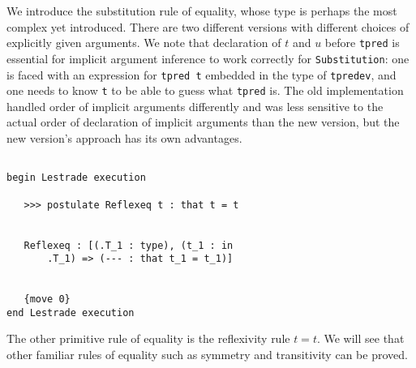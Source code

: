\documentclass[12pt]{article}
\begin{document}
We introduce the substitution rule of equality, whose type is perhaps the most complex yet introduced.   There are two different versions with different choices of explicitly given arguments.  We note that declaration of $t$ and $u$ before {\tt tpred} is essential for implicit argument inference to work correctly for {\tt Substitution}:  one is faced with an expression for
{\tt tpred t} embedded in the type of {\tt tpredev}, and one needs to know {\tt t} to be able to guess what {\tt tpred} is.   The old implementation handled order of implicit arguments
differently and was less sensitive to the actual order of declaration of implicit arguments than the new version, but the new version's approach has its own advantages.

\begin{verbatim}

begin Lestrade execution

   >>> postulate Reflexeq t : that t = t


   Reflexeq : [(.T_1 : type), (t_1 : in 
       .T_1) => (--- : that t_1 = t_1)]


   {move 0}
end Lestrade execution
\end{verbatim}

The other primitive rule of equality is the reflexivity rule $t=t$.  We will see that other familiar rules of equality such as symmetry and transitivity can be proved.
\end{document}
